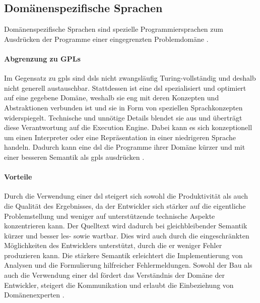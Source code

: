 \subsection{Domänenspezifische Sprachen}
    Domänenspezifische Sprachen
    sind spezielle Programmiersprachen zum Ausdrücken der Programme einer eingegrenzten
    Problemdomäne \cite[Kapitel 2.2]{voelter:DslEngineering}.

    \paragraph*{Abgrenzung zu GPLs}
    Im Gegensatz zu \glspl{gpl} sind \glspl{dsl} nicht zwangsläufig Turing-vollständig
    und deshalb nicht generell austauschbar.
    Stattdessen ist eine \gls{dsl} spezialisiert und optimiert auf eine gegebene Domäne,
    weshalb sie eng mit deren Konzepten und Abstraktionen verbunden ist
    und sie in Form von speziellen Sprachkonzepten widerspiegelt.
    Technische und unnötige Details blendet sie aus und überträgt diese Verantwortung
    auf die Execution Engine.
    Dabei kann es sich konzeptionell um einen Interpreter oder eine Repräsentation in einer
    niedrigeren Sprache handeln.
    Dadurch kann eine \gls{dsl} die Programme ihrer Domäne kürzer und mit einer besseren Semantik
    als \glspl{gpl} ausdrücken \cite[Kapitel 2.2]{voelter:DslEngineering}.

    \paragraph*{Vorteile}
    Durch die Verwendung einer \gls{dsl} steigert sich sowohl die Produktivität
    als auch die Qualität des Ergebnisses,
    da der Entwickler sich stärker auf die eigentliche Problemstellung und weniger
    auf unterstützende technische Aspekte konzentrieren kann.
    Der Quelltext wird dadurch bei gleichbleibender Semantik kürzer und besser les- sowie wartbar.
    Dies wird auch durch die eingeschränkten Möglichkeiten des Entwicklers unterstützt,
    durch die er weniger Fehler produzieren kann.
    Die stärkere Semantik erleichtert die Implementierung von Analysen und die Formulierung
    hilfreicher Fehlermeldungen.
    Sowohl der Bau als auch die Verwendung einer \gls{dsl} fördert das Verständnis der Domäne
    der Entwickler, steigert die Kommunikation und erlaubt die Einbeziehung von Domänenexperten
    \cite[Kapitel 2.5]{voelter:DslEngineering}.

